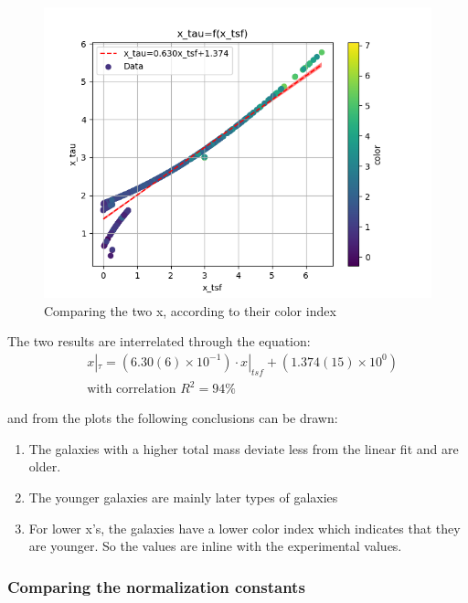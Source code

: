 \documentclass[a4paper,twocolumn]{article}
\begin{document}
\begin{figure}[!htpb]
\centering
\includegraphics[width=.9\linewidth]{./figs/x_tsf-x_tau-color_color.png}
\caption{\label{fig:Comparing the two x, according to their color index}Comparing the two x, according to their color index}
\end{figure}

The two results are interrelated through the equation:
\begin{equation}\label{eq:x_tsf-x_tau}
\begin{align}
& x|_\tau = (6.30(6) \times 10^{-1})\cdot x|_{tsf} + (1.374(15) \times 10^{0}) \\ 
& \textrm{with correlation } R^2=94\%
\end{align}
\end{equation}
\noindent

and from the plots the following conclusions can be drawn:

\begin{enumerate}
\item The galaxies with a higher total mass deviate less from the linear fit and are older.
\item The younger galaxies are mainly later types of galaxies
\item For lower x's, the galaxies have a lower color index which indicates that they are younger. So the values are inline with the experimental values.
\end{enumerate}

\subsubsection{Comparing the normalization constants}
\label{sec:org976880e}
\end{document}
